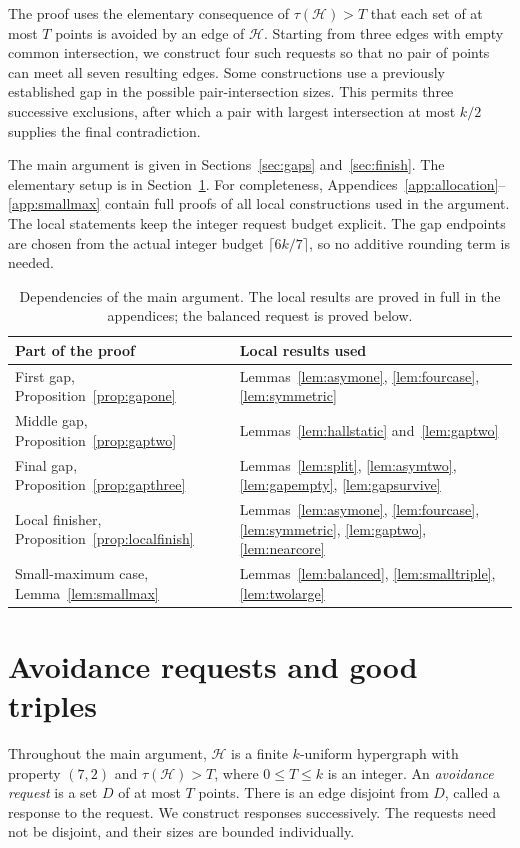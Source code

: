 \documentclass[11pt]{article}
\numberwithin{equation}{section}
\theoremstyle{definition}
\theoremstyle{remark}
\newcommand{\HH}{\mathcal H}
\begin{document}
The proof uses the elementary consequence of $\tau(\HH)>T$ that each
set of at most $T$ points is avoided by an edge of $\HH$. Starting from
three edges with empty common intersection, we construct four such
requests so that no pair of points can meet all seven resulting edges.
Some constructions use a previously established gap in the possible
pair-intersection sizes. This permits three successive exclusions,
after which a pair with largest intersection at most $k/2$ supplies the
final contradiction.

The main argument is given in Sections~\ref{sec:gaps} and~\ref{sec:finish}.
The elementary setup is in Section~\ref{sec:prelim}. For completeness,
Appendices~\ref{app:allocation}--\ref{app:smallmax} contain full proofs of
all local constructions used in the argument. The local statements keep the integer request budget explicit.
The gap endpoints are chosen from the actual integer budget
$\lceil6k/7\rceil$, so no additive rounding term is needed.

\begin{table}[ht]
\centering\small
\begin{tabular}{>{\raggedright\arraybackslash}p{}>{\raggedright\arraybackslash}p{}}
\toprule
Part of the proof & Local results used\\
\midrule
First gap, Proposition~\ref{prop:gapone}
 & Lemmas~\ref{lem:asymone}, \ref{lem:fourcase}, \ref{lem:symmetric}\\
Middle gap, Proposition~\ref{prop:gaptwo}
 & Lemmas~\ref{lem:hallstatic} and~\ref{lem:gaptwo}\\
Final gap, Proposition~\ref{prop:gapthree}
 & Lemmas~\ref{lem:split}, \ref{lem:asymtwo},
   \ref{lem:gapempty}, \ref{lem:gapsurvive}\\
Local finisher, Proposition~\ref{prop:localfinish}
 & Lemmas~\ref{lem:asymone}, \ref{lem:fourcase}, \ref{lem:symmetric},
   \ref{lem:gaptwo}, \ref{lem:nearcore}\\
Small-maximum case, Lemma~\ref{lem:smallmax}
 & Lemmas~\ref{lem:balanced}, \ref{lem:smalltriple}, \ref{lem:twolarge}\\
\bottomrule
\end{tabular}
\caption{Dependencies of the main argument. The local results are proved
in full in the appendices; the balanced request is proved below.}
\label{tab:dependencies}
\end{table}

\section{Avoidance requests and good triples}\label{sec:prelim}
Throughout the main argument, $\HH$ is a finite $k$-uniform hypergraph
with property $(7,2)$ and $\tau(\HH)>T$, where $0\le T\le k$ is an integer. An \emph{avoidance request} is a set $D$ of at most $T$ points.
There is an edge disjoint from $D$, called a response to the request.
We construct responses successively. The requests need not be disjoint,
and their sizes are bounded individually.
\end{document}
